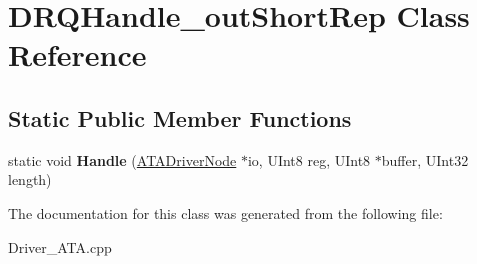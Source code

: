 \hypertarget{class_d_r_q_handle__out_short_rep}{}\section{D\+R\+Q\+Handle\+\_\+out\+Short\+Rep Class Reference}
\label{class_d_r_q_handle__out_short_rep}
\subsection*{Static Public Member Functions}
\begin{DoxyCompactItemize}
\item 
\mbox{\label{class_d_r_q_handle__out_short_rep_adc99e4e4ee3a033aba2273923f705369}} 
static void {\bfseries Handle} (\hyperlink{class_a_t_a_driver_node}{A\+T\+A\+Driver\+Node} $\ast$io, U\+Int8 reg, U\+Int8 $\ast$buffer, U\+Int32 length)
\end{DoxyCompactItemize}


The documentation for this class was generated from the following file\+:\begin{DoxyCompactItemize}
\item 
Driver\+\_\+\+A\+T\+A.\+cpp\end{DoxyCompactItemize}
